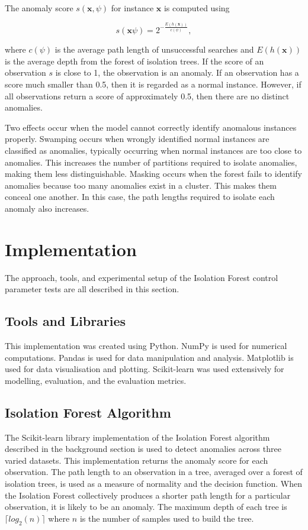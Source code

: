 \documentclass[10pt, conference]{IEEEtran}
\begin{document}
The anomaly score $s(\boldsymbol{x}, \psi)$ for instance $\boldsymbol{x}$ is computed using

\begin{equation}
	s(\boldsymbol{x} \psi) = 2^{- \frac{E(h(\boldsymbol{x}))}{c(\psi)}},
\end{equation}

where $c(\psi)$ is the average path length of unsuccessful searches and $E(h(\boldsymbol{x}))$ is the average depth from the forest of isolation trees. If the score of an observation $s$ is close to 1, the observation is an anomaly. If an observation has a score much smaller than 0.5, then it is regarded as a normal instance. However, if all observations return a score of approximately 0.5, then there are no distinct anomalies.

Two effects occur when the model cannot correctly identify anomalous instances properly. Swamping occurs when wrongly identified normal instances are classified as anomalies, typically occurring when normal instances are too close to anomalies. This increases the number of partitions required to isolate anomalies, making them less distinguishable. Masking occurs when the forest fails to identify anomalies because too many anomalies exist in a cluster. This makes them conceal one another. In this case, the path lengths required to isolate each anomaly also increases.


\section{Implementation}
The approach, tools, and experimental setup of the Isolation Forest control parameter tests are all described in this section.
\subsection{Tools and Libraries}
This implementation was created using Python. NumPy\cite{harris2020array} is used for numerical computations. Pandas\cite{reback2020pandas} is used for data manipulation and analysis. Matplotlib\cite{Hunter:2007} is used for data visualisation and plotting. Scikit-learn\cite{scikit-learn} was used extensively for modelling, evaluation, and the evaluation metrics.
\subsection{Isolation Forest Algorithm}
The Scikit-learn library \cite{scikit-learn} implementation of the Isolation Forest algorithm described in the background section is used to detect anomalies across three varied datasets. This implementation returns the anomaly score for each observation. The path length to an observation in a tree, averaged over a forest of isolation trees, is used as a measure of normality and the decision function. When the Isolation Forest collectively produces a shorter path length for a particular observation, it is likely to be an anomaly. The maximum depth of each tree is $\lceil log_2(n) \rceil$ where $n$ is the number of samples used to build the tree.
\end{document}
